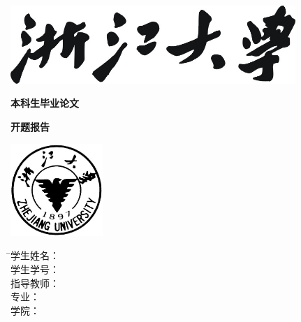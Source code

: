 
\thispagestyle{empty}

\vspace{5mm}

\begin{center}
   \includegraphics[width=108mm]{images/zjdx}
\end{center}

\centerline{\songti\xiaoyi\textbf{本科生毕业论文}}
\centerline{\songti\xiaoyi\textbf{开题报告}}
\vspace{4mm}

\begin{center}
  \includegraphics[width=35mm]{images/standxb}
\end{center}

\vspace{32mm}

\begin{tabbing}
               \hspace{30mm} \= \songti\sihao 学生姓名： \= \underline{\makebox[6cm]{\sihao\zjuauthornamec\hspace{3mm}\zjuauthorid}} \\[2mm]
              \> \songti\sihao 学生学号： \> \underline{} \\[2mm]
              \> \songti\sihao 指导教师： \> \underline{\makebox[6cm]{\sihao\zjumentorc}} \\[2mm]
              \> \songti\sihao 专\hspace{10mm}业： \> \underline{\makebox[6cm]{\sihao\zjugrade\hspace{3mm}\zjumajor}} \\[2mm]
              \> \songti\sihao 学\hspace{10mm}院： \> \underline{\makebox[6cm]{\sihao\zjucollegec}}
\end{tabbing}


